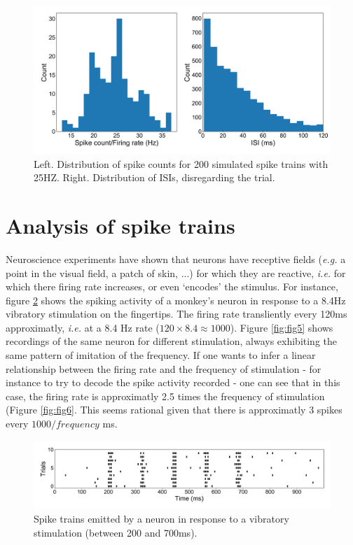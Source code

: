 \documentclass{article}
\begin{document}
\begin{figure}[H]
\centering
\includegraphics[width=.8\linewidth]{report3_fig15.png}
\caption[spt]{Left. Distribution of spike counts for 200 simulated spike trains with 25HZ. Right. Distribution of ISIs, disregarding the trial.}\label{fig:fig3}
\end{figure}

\section{Analysis of spike trains}\label{ana}
\indent\indent Neuroscience experiments have shown that neurons have receptive fields (\textit{e.g.} a point in the visual field, a patch of skin, ...) for which they are reactive, \textit{i.e.} for which there firing rate increases, or even `encodes' the stimulus. For instance, figure \ref{fig:fig4} shows the spiking activity of a monkey's neuron in response to a 8.4Hz vibratory stimulation on the fingertips. The firing rate transliently every 120ms approximatly, \textit{i.e.} at a 8.4 Hz rate ($ 120 \times 8.4 \approx 1000$). Figure \ref{fig:fig5} shows recordings of the same neuron for different stimulation, always exhibiting the same pattern of imitation of the frequency. If one wants to infer a linear relationship between the firing rate and the frequency of stimulation - for instance to try to decode the spike activity recorded - one can see that in this case, the firing rate is approximatly 2.5 times the frequency of stimulation (Figure \ref{fig:fig6}. This seems rational given that there is approximatly 3 spikes every $1000/frequency$ ms.

\begin{figure}[H]
\centering
\includegraphics[width=.8\linewidth]{report3_fig6.png}
\caption[spt]{Spike trains emitted by a neuron in response to a vibratory stimulation (between 200 and 700ms).}\label{fig:fig4}
\end{figure}
\end{document}
